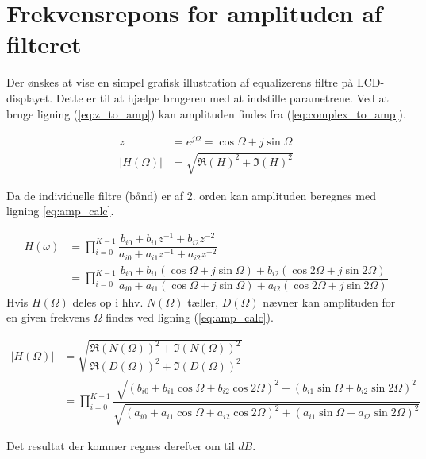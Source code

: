 \section{Frekvensrepons for amplituden af filteret }

Der ønskes at vise en simpel grafisk illustration af equalizerens filtre på LCD-displayet. 
Dette er til at hjælpe brugeren med at indstille parametrene.
Ved at bruge ligning (\ref{eq:z_to_amp}) kan amplituden findes fra (\ref{eq:complex_to_amp}).

\begin{align}
    z &= e^{j \Omega} = \cos{\Omega} + j \sin{\Omega}  
    \label{eq:z_to_amp}\\
    |H(\Omega)| &= \sqrt{ \Re{(H)}^2  + \Im{(H) }^2 }
    \label{eq:complex_to_amp}
\end{align}

Da de individuelle filtre (bånd) er af 2. orden kan amplituden beregnes med ligning \ref{eq:amp_calc}.

\begin{align}
    H(\omega) &= \prod\limits_{i=0}^{K-1} \dfrac{b_{i0} + b_{i1} z^{-1} + b_{i2} z^{-2}}{a_{i0} + a_{i1} z^{-1} + a_{i2} z^{-2}} \nonumber
    \\ &= \prod\limits_{i=0}^{K-1} \dfrac{b_{i0} + b_{i1} \left( \cos{\Omega} + j \sin{\Omega} \right)+b_{i2} \left( \cos{2\Omega} + j \sin{2\Omega} \right)}{a_{i0} + a_{i1} \left( \cos{\Omega} + j \sin{\Omega} \right)+a_{i2} \left( \cos{2\Omega} + j \sin{2\Omega} \right)} \label{eq:amp_rep}
\end{align}
Hvis $H(\Omega)$ deles op i hhv. $N(\Omega)$ tæller, $D(\Omega)$ nævner kan amplituden for en 
given frekvens $\Omega$ findes ved ligning (\ref{eq:amp_calc}).

\begin{align}
    |H(\Omega)| &= \sqrt{ \dfrac{\Re{(N(\Omega))}^2 + \Im{(N(\Omega))}^2 }{\Re{(D(\Omega))}^2 + \Im{(D(\Omega))}^2 }} \nonumber	\\ 
     &= \prod\limits_{i=0}^{K-1} \dfrac{ \sqrt{\left( b_{i0} + b_{i1} \cos{\Omega} + b_{i2} \cos{2 \Omega} \right)^2 +  \left( b_{i1} \sin{\Omega} + b_{i2} \sin{2 \Omega} \right)^2 } }{ \sqrt{\left( a_{i0} + a_{i1} \cos{\Omega} + a_{i2} \cos{2 \Omega} \right)^2 + \left( a_{i1} \sin{\Omega} + a_{i2} \sin{2 \Omega} \right)^2} }
    \label{eq:amp_calc}
\end{align}

Det resultat der kommer regnes derefter om til $dB$.



